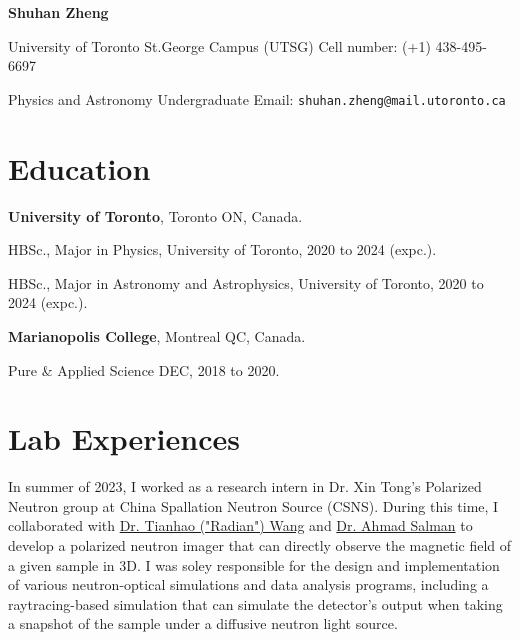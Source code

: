 \documentclass{article}
\newcommand{\cvsection}[1]{\section*{\rmfamily#1}}
\begin{document}
\begin{center}
    \Huge{
    \rmfamily
    \textbf{Shuhan Zheng}}
\end{center}
\vspace{20pt}    

\setlength{\parskip}{1pt}
\renewcommand{\arraystretch}{1.25}


\noindent University of Toronto St.George Campus (UTSG)  \hfill Cell number: (+1) 438-495-6697

\noindent Physics and Astronomy Undergraduate \hfill {Email: \texttt{shuhan.zheng@mail.utoronto.ca}}


\setlength{\parskip}{3pt}






\cvsection{Education}
\indent 

\textbf{University of Toronto}, Toronto ON, Canada.

\hspace{2em} HBSc., Major in Physics, University of Toronto, 2020 to 2024 (expc.).

\hspace{2em} HBSc., Major in Astronomy and Astrophysics, University of Toronto, 2020 to 2024 (expc.).

\textbf{Marianopolis College}, Montreal QC, Canada.

\hspace{2em} Pure \& Applied Science DEC, 2018 to 2020.

\cvsection{Lab Experiences}


\hspace{2em}In summer of 2023, I worked as a research intern in Dr. Xin Tong's Polarized Neutron group at China Spallation Neutron Source (CSNS). During this time, I collaborated with \href{https://www.researchgate.net/profile/Tianhao-Wang-14}{Dr. Tianhao ("Radian") Wang} and \href{URL}{Dr. Ahmad Salman} to develop a polarized neutron imager that can directly observe the magnetic field of a given sample in 3D. I was soley responsible for the design and implementation of various neutron-optical simulations and data analysis programs, including a raytracing-based simulation that can simulate the detector's output when taking a snapshot of the sample under a diffusive neutron light source.
\end{document}
